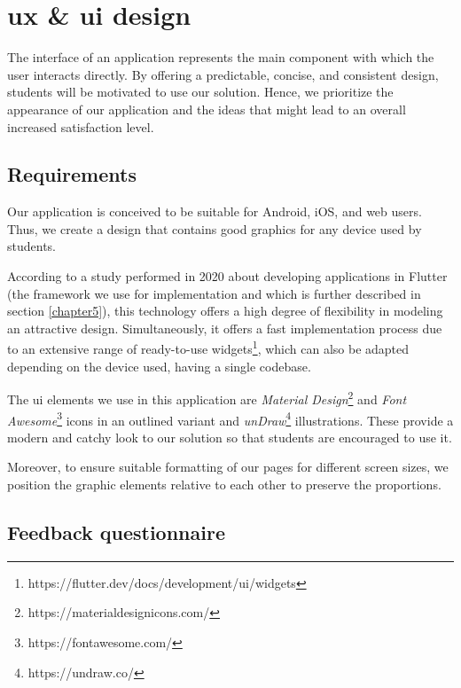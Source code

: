 \chapter{\acrshort{ux} \& \acrshort{ui} design} \label{chapter4}

    The interface of an application represents the main component with which the user interacts directly. By offering a predictable, concise, and consistent design, students will be motivated to use our solution. Hence, we prioritize the appearance of our application and the ideas that might lead to an overall increased satisfaction level.

\section{Requirements} \label{4:requirements}

    Our application is conceived to be suitable for Android, iOS, and web users. Thus, we create a design that contains good graphics for any device used by students.
    
    According to a study \cite{flutter2020experience} performed in 2020 about developing applications in Flutter (the framework we use for implementation and which is further described in section \ref{chapter5}), this technology offers a high degree of flexibility in modeling an attractive design. Simultaneously, it offers a fast implementation process due to an extensive range of ready-to-use widgets\footnote{https://flutter.dev/docs/development/ui/widgets}, which can also be adapted depending on the device used, having a single codebase.
    
    The \acrshort{ui} elements we use in this application are \textit{Material Design}\footnote{https://materialdesignicons.com/} and \textit{Font Awesome}\footnote{https://fontawesome.com/} icons in an outlined variant and \textit{unDraw}\footnote{https://undraw.co/} illustrations. These provide a modern and catchy look to our solution so that students are encouraged to use it.
    
    Moreover, to ensure suitable formatting of our pages for different screen sizes, we position the graphic elements relative to each other to preserve the proportions.

\section{Feedback questionnaire} \label{4:feedback_questionnaire}

